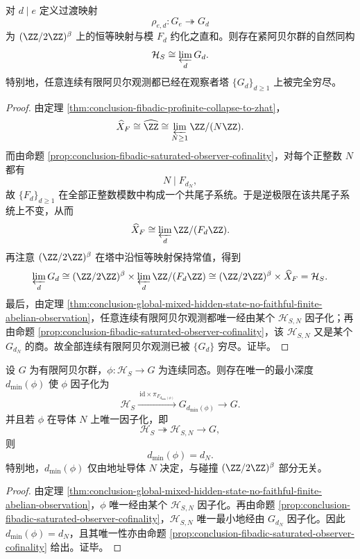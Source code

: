 \begin{theorem}[饱和有限观察者塔的逆极限重建]\label{thm:conclusion-fibadic-saturated-observer-inverse-limit}
对 \(d\mid e\) 定义过渡映射
\[
\rho_{e,d}:G_e\twoheadrightarrow G_d
\]
为 \((\ZZ/2\ZZ)^\beta\) 上的恒等映射与模 \(F_d\) 约化之直和。则存在紧阿贝尔群的自然同构
\[
\mathcal H_S
\cong
\varprojlim_{d} G_d.
\]
特别地，任意连续有限阿贝尔观测都已经在观察者塔 \(\{G_d\}_{d\ge 1}\) 上被完全穷尽。
\end{theorem}
\begin{proof}
由定理 \ref{thm:conclusion-fibadic-profinite-collapse-to-zhat}，
\[
\widehat X_F\cong \widehat{\ZZ}\cong \varprojlim_{N\ge 1}\ZZ/(N\ZZ).
\]
而由命题 \ref{prop:conclusion-fibadic-saturated-observer-cofinality}，对每个正整数 \(N\) 都有
\[
N\mid F_{d_N},
\]
故 \(\{F_d\}_{d\ge 1}\) 在全部正整数模数中构成一个共尾子系统。于是逆极限在该共尾子系统上不变，从而
\[
\widehat X_F
\cong
\varprojlim_d \ZZ/(F_d\ZZ).
\]
再注意 \((\ZZ/2\ZZ)^\beta\) 在塔中沿恒等映射保持常值，得到
\[
\varprojlim_d G_d
\cong
(\ZZ/2\ZZ)^\beta\times \varprojlim_d \ZZ/(F_d\ZZ)
\cong
(\ZZ/2\ZZ)^\beta\times \widehat X_F
=
\mathcal H_S.
\]
最后，由定理 \ref{thm:conclusion-global-mixed-hidden-state-no-faithful-finite-abelian-observation}，任意连续有限阿贝尔观测都唯一经由某个 \(\mathcal H_{S,N}\) 因子化；再由命题 \ref{prop:conclusion-fibadic-saturated-observer-cofinality}，该 \(\mathcal H_{S,N}\) 又是某个 \(G_{d_N}\) 的商。故全部连续有限阿贝尔观测已被 \(\{G_d\}\) 穷尽。证毕。
\end{proof}

\begin{corollary}[有限阿贝尔观测的最小深度判据]\label{cor:conclusion-fibadic-saturated-observer-minimal-depth}
设 \(G\) 为有限阿贝尔群，\(\phi:\mathcal H_S\to G\) 为连续同态。则存在唯一的最小深度 \(d_{\min}(\phi)\) 使 \(\phi\) 因子化为
\[
\mathcal H_S\xrightarrow{\ \mathrm{id}\times \pi_{F_{d_{\min}(\phi)}}\ } G_{d_{\min}(\phi)}\longrightarrow G.
\]
并且若 \(\phi\) 在导体 \(N\) 上唯一因子化，即
\[
\mathcal H_S\twoheadrightarrow \mathcal H_{S,N}\longrightarrow G,
\]
则
\[
d_{\min}(\phi)=d_N.
\]
特别地，\(d_{\min}(\phi)\) 仅由地址导体 \(N\) 决定，与碰撞 \((\ZZ/2\ZZ)^\beta\) 部分无关。
\end{corollary}
\begin{proof}
由定理 \ref{thm:conclusion-global-mixed-hidden-state-no-faithful-finite-abelian-observation}，\(\phi\) 唯一经由某个 \(\mathcal H_{S,N}\) 因子化。再由命题 \ref{prop:conclusion-fibadic-saturated-observer-cofinality}，\(\mathcal H_{S,N}\) 唯一最小地经由 \(G_{d_N}\) 因子化。因此 \(d_{\min}(\phi)=d_N\)，且其唯一性亦由命题 \ref{prop:conclusion-fibadic-saturated-observer-cofinality} 给出。证毕。
\end{proof}

